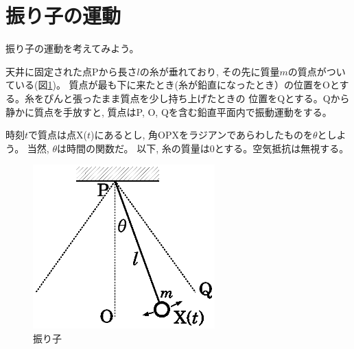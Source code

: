 \section{振り子の運動}

振り子の運動を考えてみよう。

\begin{q}\label{q:furiko_energy}
天井に固定された点Pから長さ$l$の糸が垂れており, その先に質量$m$の質点がついている(図\ref{fig:pendulum})。
質点が最も下に来たとき(糸が鉛直になったとき）の位置をOとする。糸をぴんと張ったまま質点を少し持ち上げたときの
位置をQとする。Qから静かに質点を手放すと, 質点はP, O, Qを含む鉛直平面内で振動運動をする。

時刻$t$で質点は点X($t$)にあるとし, 角OPXをラジアンであらわしたものを$\theta$としよう。
当然, $\theta$は時間の関数だ。
以下, 糸の質量は0とする。空気抵抗は無視する。\mv
\begin{figure}[h]
    \centering
    \includegraphics[width=7cm]{pendulum.eps}
    \caption{振り子}\label{fig:pendulum}
\end{figure}


\end{q}
